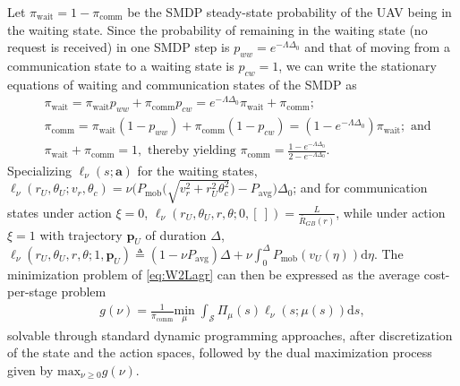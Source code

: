 \documentclass[12pt, draftcls, onecolumn]{IEEEtran}
\theoremstyle{plain}
\theoremstyle{definition}
\theoremstyle{remark}
\begin{document}
Let $\pi_{\mathrm{wait}}{=}1{-}\pi_{\mathrm{comm}}$ be the SMDP steady-state probability of the UAV being in the waiting state.
Since the probability of remaining in the waiting state (no request is received) in one SMDP step is $p_{ww}{=}e^{-\Lambda \Delta_0}$ and that of moving from a communication state to a waiting state is
$p_{cw}{=}1$, we can write the stationary equations of waiting and communication states of the SMDP as
\begin{align}
    &\pi_{\mathrm{wait}} = \pi_{\mathrm{wait}}p_{ww} + \pi_{\mathrm{comm}}p_{cw} = e^{-\Lambda \Delta_0}\pi_{\mathrm{wait}} + \pi_{\mathrm{comm}};\nonumber\\
    &\pi_{\mathrm{comm}} = \pi_{\mathrm{wait}}(1-p_{ww}) + \pi_{\mathrm{comm}}(1-p_{cw}) = (1-e^{-\Lambda \Delta_0})\pi_{\mathrm{wait}};\text{ and}\\
    &\pi_{\mathrm{wait}} + \pi_{\mathrm{comm}} = 1,\text{ thereby yielding $\pi_{\mathrm{comm}}{=}\frac{1{-}e^{-\Lambda\Delta_{0}}}{2-e^{-\Lambda\Delta_{0}}}$.}\nonumber
\end{align}
Specializing $\ell_{\nu}(s;\mathbf{a})$ for the waiting states, $\ell_{\nu}(r_{U},\theta_{U};v_{r},\theta_{c}){=}\nu\Big(P_{\mathrm{mob}}\Big(\sqrt{v_{r}^{2}{+}r_{U}^{2}\theta_{c}^{2}}\Big){-}P_{\mathrm{avg}}\Big)\Delta_{0}$; and for {communication} states under action $\xi{=}0$, $\ell_{\nu}(r_{U},\theta_{U},r,\theta;0, [\ ]){=}\frac{L}{\bar{R}_{GB}(r)}$, while under action $\xi{=}1$ with trajectory $\mathbf{p}_{U}$ of duration $\Delta$, $\ell_{\nu}(r_{U},\theta_{U},r,\theta;1,\mathbf{p}_{U}){\triangleq}(1{-}\nu P_{\mathrm{avg}})\Delta{+}\nu\int_{0}^\Delta P_{\mathrm{mob}}\left(v_{U}(\eta)\right)\mathrm{d}\eta$. The minimization problem of \eqref{eq:W2Lagr} can then be expressed as the {average cost-per-stage problem}
\begin{align}\label{eq:TotalGMin}
	g(\nu) = \frac{1}{\pi_{\mathrm{comm}}}\underset{\mu}{\mathrm{min}} \; \int_{\mathcal{S}} \Pi_{\mu}(s) 
	\ell_\nu(s; \mu(s))\mathrm d s,
\end{align}
solvable through standard dynamic programming approaches, after discretization of the state and the action spaces, followed by the dual maximization process given by $\mathrm{max}_{\nu{\geq}0}g(\nu)$.
\end{document}
